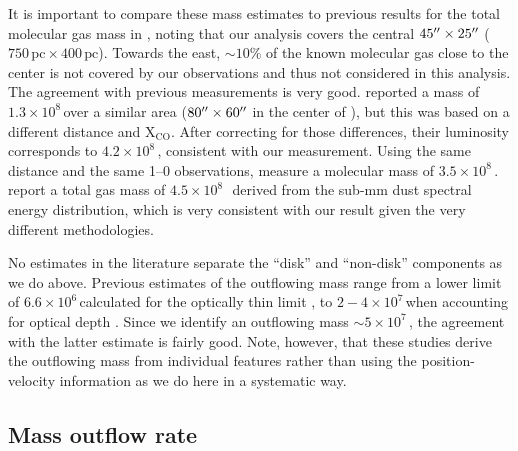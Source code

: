It is important to compare these mass estimates to previous results for the total molecular gas mass in , noting that our analysis
covers the central $45^{\prime\prime} \times 25^{\prime\prime}$ ($750\,\mathrm{pc} \times 400\,\mathrm{pc}$). Towards the east, $\sim 10\%$ of the known molecular gas close to the center is not covered by our  observations and thus not considered in this analysis. The agreement with previous measurements is very good. \citet{1996A&A...305..421M} reported a mass of $1.3 \times 10^8$\,\Msun over a similar area ($80^{\prime\prime} \times 60^{\prime\prime}$ in the center of ), but this was based on a different distance and $\mathrm{X}_{\mathrm{CO}}$. After correcting for those differences, their luminosity corresponds to $4.2 \times 10^8$\,\Msun, consistent with our measurement. Using the same distance and the same 1--0 observations, \citet{Leroy:2015ds} measure a molecular mass of $3.5 \times 10^8$\,\Msun. 
\citet{2018ApJ...860...23P} report a total gas mass of $4.5 \times 10^8$\,\Msun\ derived from the sub-mm dust spectral energy distribution, which is very consistent with our result given the very different methodologies. 

No estimates in the literature separate the ``disk'' and ``non-disk'' components as we do above. Previous estimates of the outflowing mass range from a lower limit of $6.6 \times 10^6$\,\Msun calculated for the optically thin limit \citep{2013Natur.499..450B}, to $2-4 \times 10^7$\,\Msun  when accounting for optical depth \citep{2018ApJ...867..111Z}. Since we identify an outflowing mass $\sim5\times10^7$\,\Msun, the agreement with the latter estimate is fairly good. Note, however, that these studies derive the outflowing mass from individual features rather than using the position-velocity information as we do here in a systematic way.



\subsection{Mass outflow rate}
\label{outflow: section: outflow rate}

